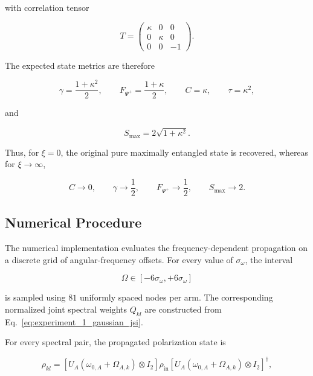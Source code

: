 with correlation tensor

\begin{equation}
T
=
\begin{pmatrix}
\kappa & 0 & 0 \\
0 & \kappa & 0 \\
0 & 0 & -1
\end{pmatrix}.
\label{eq:experiment_1_analytical_tensor}
\end{equation}

The expected state metrics are therefore

\begin{equation}
\gamma
=
\frac{1+\kappa^2}{2},
\qquad
F_{\Psi^+}
=
\frac{1+\kappa}{2},
\qquad
C=\kappa,
\qquad
\tau=\kappa^2,
\label{eq:experiment_1_analytical_metrics}
\end{equation}

and

\begin{equation}
S_{\max}
=
2\sqrt{1+\kappa^2}.
\label{eq:experiment_1_analytical_chsh}
\end{equation}

Thus, for \(\xi=0\), the original pure maximally entangled state is recovered,
whereas for \(\xi\rightarrow\infty\),

\[
C\rightarrow0,
\qquad
\gamma\rightarrow\frac{1}{2},
\qquad
F_{\Psi^+}\rightarrow\frac{1}{2},
\qquad
S_{\max}\rightarrow2.
\]


\subsection{Numerical Procedure}
\label{subsec:experiment_1_numerical_procedure}

The numerical implementation evaluates the frequency-dependent propagation on a
discrete grid of angular-frequency offsets. For every value of
\(\sigma_\omega\), the interval

\[
\Omega
\in
[-6\sigma_\omega,+6\sigma_\omega]
\]

is sampled using \(81\) uniformly spaced nodes per arm. The corresponding
normalized joint spectral weights \(Q_{kl}\) are constructed from
Eq.~\eqref{eq:experiment_1_gaussian_jsi}.

For every spectral pair, the propagated polarization state is

\begin{equation}
\rho_{kl}
=
\left[
U_A(\omega_{0,A}+\Omega_{A,k})
\otimes I_2
\right]
\rho_{\mathrm{in}}
\left[
U_A(\omega_{0,A}+\Omega_{A,k})
\otimes I_2
\right]^\dagger,
\end{equation}

